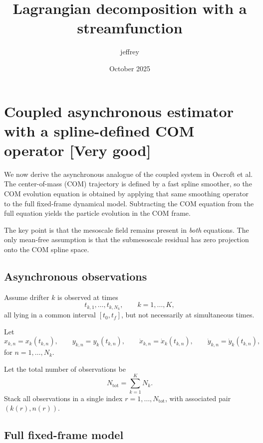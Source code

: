 \documentclass{article}
\title{Lagrangian decomposition with a streamfunction}
\author{jeffrey }
\date{October 2025}
\begin{document}
\maketitle

\section{Coupled asynchronous estimator with a spline-defined COM operator [Very good]}

We now derive the asynchronous analogue of the coupled system in Oscroft et al.
The center-of-mass (COM) trajectory is defined by a fast spline smoother, so the COM
evolution equation is obtained by applying that same smoothing operator to the full
fixed-frame dynamical model. Subtracting the COM equation from the full equation yields
the particle evolution in the COM frame.

The key point is that the mesoscale field remains present in \emph{both} equations.
The only mean-free assumption is that the submesoscale residual has zero projection onto
the COM spline space.

\subsection{Asynchronous observations}

Assume drifter $k$ is observed at times
\begin{equation}
t_{k,1},\dots,t_{k,N_k}, \qquad k=1,\dots,K,
\end{equation}
all lying in a common interval $[t_0,t_f]$, but not necessarily at simultaneous times.

Let
\begin{equation}
x_{k,n}=x_k(t_{k,n}), \qquad y_{k,n}=y_k(t_{k,n}),
\qquad
\dot{x}_{k,n}=\dot{x}_k(t_{k,n}), \qquad \dot{y}_{k,n}=\dot{y}_k(t_{k,n}),
\end{equation}
for $n=1,\dots,N_k$.

Let the total number of observations be
\begin{equation}
N_{\mathrm{tot}}=\sum_{k=1}^K N_k.
\end{equation}
Stack all observations in a single index $r=1,\dots,N_{\mathrm{tot}}$, with associated pair
$(k(r),n(r))$.

\subsection{Full fixed-frame model}
\end{document}

